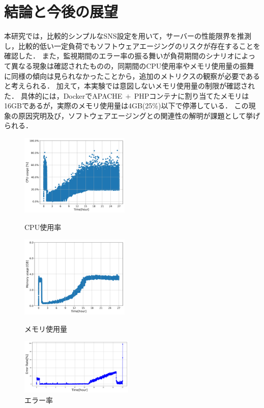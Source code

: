 \documentclass[twoside,twocolumn,10pt]{jarticle}  %
\begin{document}
\section{結論と今後の展望}
本研究では，比較的シンプルなSNS設定を用いて，サーバーの性能限界を推測し，比較的低い一定負荷でもソフトウェアエージングのリスクが存在することを確認した．
また，監視期間のエラー率の振る舞いが負荷期間のシナリオによって異なる現象は確認されたものの，同期間のCPU使用率やメモリ使用量の振舞に同様の傾向は見られなかったことから，追加のメトリクスの観察が必要であると考えられる．
加えて，本実験では意図しないメモリ使用量の制限が確認された．
具体的には，DockerでAPACHE$~+~$PHPコンテナに割り当てたメモリは16GBであるが，実際のメモリ使用量は4GB(25\%)以下で停滞している．
この現象の原因究明及び，ソフトウェアエージングとの関連性の解明が課題として挙げられる．\par
\begin{figure}[t]
  \centering
  \includegraphics[width=5.2cm]{figures/8core_1_15rps_increase_cpu.png}
  \vspace{-0.5cm}
  \caption{CPU使用率}
  \label{f1}

  \centering
  \includegraphics[width=5.2cm]{figures/8core_1_15rps_increase_mem.png}
  \vspace{-0.5cm}
  \caption{メモリ使用量}
  \label{f2}

  \centering
  \includegraphics[width=5.4cm]{figures/or_8core_1_15_error_rate.png}
  \vspace{-0.5cm}
  \caption{エラー率}
  \label{f3}
  \vspace{-0.5cm}
\end{figure}
\end{document}
